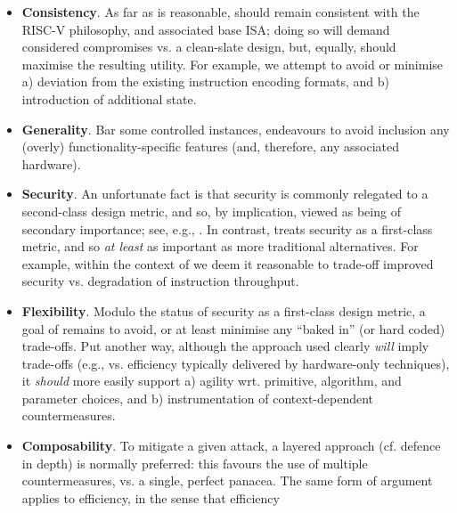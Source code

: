 \begin{itemize}
      \begin{itemize}
      \item {\bf      Consistency}.
            As far as is reasonable, \XCID should remain consistent with the
            RISC-V philosophy, and associated base ISA; doing so will demand 
            considered compromises vs. a clean-slate design, but, equally,
            should maximise the resulting utility.
            For example,
            we attempt to avoid or minimise 
            a) deviation from the existing instruction encoding formats,
               and 
            b) introduction of additional state.
      \item {\bf       Generality}.
            Bar some controlled instances, \XCID endeavours to avoid inclusion
            any (overly) functionality-specific features (and, therefore, any
            associated hardware).  
      \item {\bf         Security}.
            An unfortunate fact is that security is commonly relegated to a 
            second-class design metric, and so, by implication, viewed as 
            being of secondary importance;
            see, e.g., \cite{SCARV:Lee:03,SCARV:RKLMR:03,SCARV:RRKH:04,SCARV:BurMutTiw:16}.
            In contrast, \XCID treats security as a first-class metric, and
            so {\em at least} as important as more traditional alternatives.
            For example,
            within the context of \XCID we deem it reasonable to trade-off 
            improved security vs. degradation of instruction throughput.
      \item {\bf      Flexibility}. 
            Modulo the status of security as a first-class design metric, a
            goal of \XCID remains to avoid, or at least minimise any ``baked 
            in'' (or hard coded) trade-offs.  Put another way, although the 
            approach used clearly {\em will} imply trade-offs 
            (e.g., vs. efficiency typically delivered by hardware-only techniques), 
            it {\em should} more easily support
            a) agility wrt. primitive, algorithm, and parameter choices,
               and
            b) instrumentation of context-dependent countermeasures.
      \item {\bf    Composability}.
            To mitigate a given attack, a layered approach (cf. defence in 
            depth) is normally preferred: this favours the use of multiple
            countermeasures, vs. a single, perfect panacea.  The same form
            of argument applies to efficiency, in the sense that efficiency 

\end{itemize}
\end{itemize}
